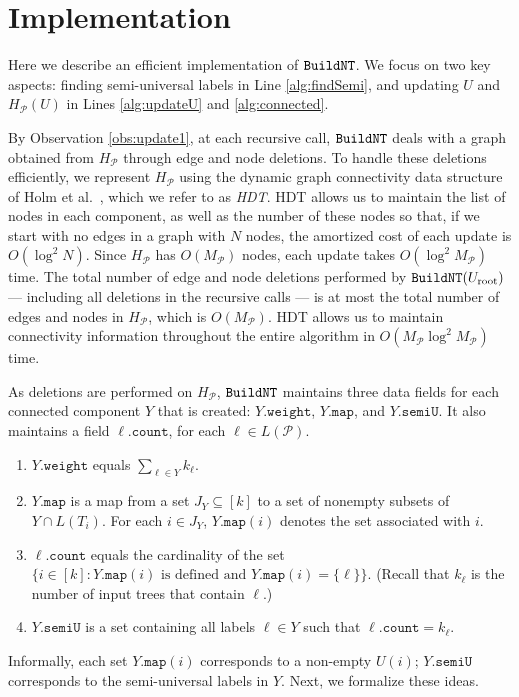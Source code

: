 \documentclass[11pt]{article}
\newcommand{\MP}{\ensuremath{M_\P}} \newcommand{\TG}{\ensuremath{\Gamma}} \newcommand{\incompatible}{\texttt{incompatible}}
\newcommand{\Uinit}{\ensuremath{U_\mathrm{root}}} \newcommand{\Ubef}{\ensuremath{U_\mathrm{bef}}} \newcommand{\Uaft}{\ensuremath{U_\mathrm{aft}}} \newcommand{\Urem}{\ensuremath{U_\mathrm{rem}}} \newcommand{\Yinit}{\ensuremath{Y_\mathrm{root}}} \newcommand{\Winit}{\ensuremath{W_\mathrm{root}}} \newcommand{\indeg}{\ensuremath{\mathrm{indegree}}} \newcommand{\Desc}{\ensuremath{\mathrm{Desc}}}
\newcommand{\DG}{\ensuremath{H_\P}} \newcommand{\GBNT}{\ensuremath{G_{\mathtt{BNT}}}}
\renewcommand{\P}{\ensuremath{\mathcal{P}}}
\newcommand{\cnt}{\ensuremath{\mathtt{count}}} \newcommand{\ID}{\ensuremath{\mathtt{id}}} \newcommand{\TYPE}{\ensuremath{\mathtt{in}}} \newcommand{\SIZE}{\ensuremath{\mathtt{size}}} \newcommand{\COUNT}{\ensuremath{\mathtt{count}}} \newcommand{\SET}{\ensuremath{\mathtt{set}}} \newcommand{\SEMI}{\ensuremath{\mathtt{semiU}}} \newcommand{\LABEL}{\ensuremath{\mathtt{label}}} \newcommand{\WEIGHT}{\ensuremath{\mathtt{weight}}} \newcommand{\NULL}{\ensuremath{\mathtt{null}}} \newcommand{\MAP}{\ensuremath{\mathtt{map}}} \newcommand{\KEY}{\ensuremath{\mathtt{key}}} \newcommand{\VALUE}{\ensuremath{\mathtt{value}}} \newcommand{\KEYSET}{\ensuremath{\mathtt{keySet}}}
\theoremstyle{definition}
\begin{document}
\section{Implementation}\label{sec:implementation}

Here we describe an efficient implementation of $\texttt{BuildNT}$.  We focus on two key aspects: finding semi-universal labels in Line \ref{alg:findSemi}, and updating $U$ and $\DG(U)$ in Lines \ref{alg:updateU} and \ref{alg:connected}.  

By Observation \ref{obs:update1}, at each recursive call, $\texttt{BuildNT}$ deals with a graph obtained from $\DG$ through edge and node deletions.  To handle these deletions efficiently, we represent $\DG$ using the dynamic graph connectivity data structure of  Holm et al.\ \cite{HolmLichtenbergThorup:2001}, which we refer to as \emph{HDT}.  HDT allows us to maintain the list of nodes in each component, as well as the number of these nodes so that, if we start with no edges in a graph with $N$ nodes, the amortized cost of each update is $O(\log^2 N)$.  Since $\DG$ has $O(\MP)$ nodes, each update takes $O(\log^2 \MP)$ time.  
The total number of edge and node deletions performed by $\SLBuild(\Uinit)$ --- including all deletions in the recursive calls --- is at most the total number of edges and nodes in $\DG$, which is $O(\MP)$.  HDT allows us to maintain connectivity information throughout the entire algorithm in $O(\MP \log^2 \MP)$ time.

As deletions are performed on $\DG$, $\texttt{BuildNT}$ maintains three data fields for each connected component $Y$ that is created: $Y.\WEIGHT$, $Y.\MAP$, and $Y.
\SEMI$.  It also maintains a field $\ell.\cnt$, for each $\ell \in L(\P)$.  
\vspace{-0.1cm}
\begin{enumerate}
\vspace{-0.5\parskip}
 \itemsep1pt \parskip0pt 
\item
$Y.\WEIGHT$ equals $\sum_{\ell \in Y} k_\ell$.
\item
$Y.\MAP$ is a map from a set $J_Y \subseteq [k]$ to a set of nonempty subsets of $Y \cap L(T_i)$.  For each $i \in J_Y$, $Y.\MAP(i)$ denotes the set associated with $i$.
\item
$\ell.\cnt$ equals the cardinality of the set
$\{i \in [k] : Y.\MAP(i) \text{ is defined and } Y.\MAP(i) = \{\ell\}\}$. (Recall that $k_\ell$ is the number of input trees that contain $\ell$.)
\item
$Y.\SEMI$ is a set containing all labels $\ell \in Y$ such that $\ell.\cnt = k_\ell$.   
\end{enumerate}
\vspace{-0.1cm}
Informally, each set $Y.\MAP(i)$ corresponds to a non-empty $U(i)$; $Y.\SEMI$ corresponds to the semi-universal labels in $Y$.  Next, we formalize these ideas.
\end{document}
